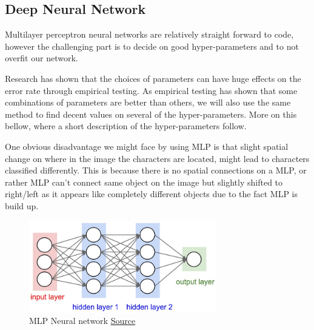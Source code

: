 \documentclass[Report.tex]{subfiles}
\begin{document}
  \begin{flushleft}
    \subsection{Deep Neural Network} 
    \label{Recognition:subsec:MLP}
    Multilayer perceptron neural networks are relatively straight
    forward to code, however the challenging part is to decide on good hyper-parameters and to not overfit our network. \par
    Research has shown that the choices of parameters can have huge effects on the error rate through empirical testing. As empirical testing has shown that some combinations of parameters are better than others, we will also use the same method to find decent values on several of the hyper-parameters. More on this bellow, where a short description of the hyper-parameters follow. \par
    One obvious disadvantage we might face by using MLP is that slight spatial change on where in the image the characters are located, might lead to characters classified differently. This is because there is no spatial connections on a MLP, or rather MLP can't connect same object on the image but slightly shifted to right/left as it appears like completely different objects due to the fact MLP is build up.
  \end{flushleft}
  
  \begin{figure}[H]
    \centering
    \includegraphics[height=4cm]{res/neural_net2.jpeg}
    \caption{MLP Neural network \href{http://cs231n.github.io/neural-networks-1/}{Source}}
    \label{fig:neural_net2}
  \end{figure}
  
\end{document}
